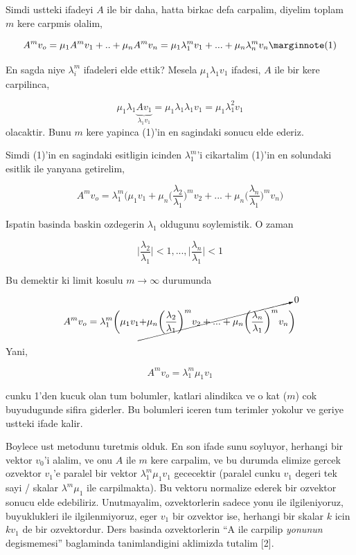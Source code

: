 \documentclass[12pt,fleqn]{article}\usepackage{../common}
\begin{document}
Simdi ustteki ifadeyi $A$ ile bir daha, hatta birkac defa carpalim, diyelim
toplam $m$ kere carpmis olalim,


$$ A^m v_o = \mu_1 A^m v_1 + .. + \mu_n A^m v_n =
\mu_1\lambda_1^mv_1 + ... + \mu_n\lambda_n^mv_n
\mlabel{1}
$$

En sagda niye $\lambda_i^m$ ifadeleri elde ettik? Mesela $\mu_1\lambda_1v_1$ ifadesi, $A$ ile bir kere carpilinca,

$$ \mu_1\lambda_1\underbrace{Av_1}_{\lambda_1v_1} =
\mu_1\lambda_1\lambda_1v_1 = 
\mu_1\lambda_1^2v_1 
  $$
olacaktir. Bunu $m$ kere yapinca (1)'in en sagindaki sonucu elde ederiz. 

Simdi (1)'in en sagindaki esitligin icinden $\lambda_1^m$'i cikartalim
(1)'in en solundaki esitlik ile yanyana getirelim,

$$ A^m v_o = 
\lambda_1^m \bigg(  
\mu_1v_1 
+ \mu_n \bigg(\frac{\lambda_2}{\lambda_1}\bigg)^m v_2
+ ... 
+ \mu_n \bigg(\frac{\lambda_n}{\lambda_1}\bigg)^m v_n
\bigg)
$$

Ispatin basinda baskin ozdegerin $\lambda_1$ oldugunu soylemistik. O zaman 

$$ 
\bigg| \frac{\lambda_2}{\lambda_1} \bigg| < 1, ..., 
\bigg| \frac{\lambda_n}{\lambda_1} \bigg| < 1
 $$

Bu demektir ki limit kosulu $m \to \infty$ durumunda

$$ A^m v_o = 
\lambda_1^m \bigg(  
\mu_1v_1 
\cancelto{0}
{
+ \mu_n \bigg(\frac{\lambda_2}{\lambda_1}\bigg)^m v_2
+ ... 
+ \mu_n \bigg(\frac{\lambda_n}{\lambda_1}\bigg)^m v_n
}
\bigg)
$$

Yani,

$$ A^m v_o = \lambda_1^m  \mu_1v_1 
$$

cunku 1'den kucuk olan tum bolumler, katlari alindikca ve o kat ($m$) cok
buyudugunde sifira giderler. Bu bolumleri iceren tum terimler yokolur ve
geriye ustteki ifade kalir. 

Boylece ust metodunu turetmis olduk. En son ifade sunu soyluyor, herhangi
bir vektor $v_0$'i alalim, ve onu $A$ ile $m$ kere carpalim, ve bu durumda
elimize gercek ozvektor $v_1$'e paralel bir vektor $\lambda_1^m \mu_1v_1$
gececektir (paralel cunku $v_1$ degeri tek sayi / skalar $\lambda^m\mu_1$
ile carpilmakta). Bu vektoru normalize ederek bir ozvektor sonucu elde
edebiliriz. Unutmayalim, ozvektorlerin sadece yonu ile ilgileniyoruz,
buyuklukleri ile ilgilenmiyoruz, eger $v_1$ bir ozvektor ise, herhangi bir
skalar $k$ icin $kv_1$ de bir ozvektordur. Ders basinda ozvektorlerin ``A
ile carpilip {\em yonunun} degismemesi'' baglaminda tanimlandigini
aklimizda tutalim [2].
\end{document}
